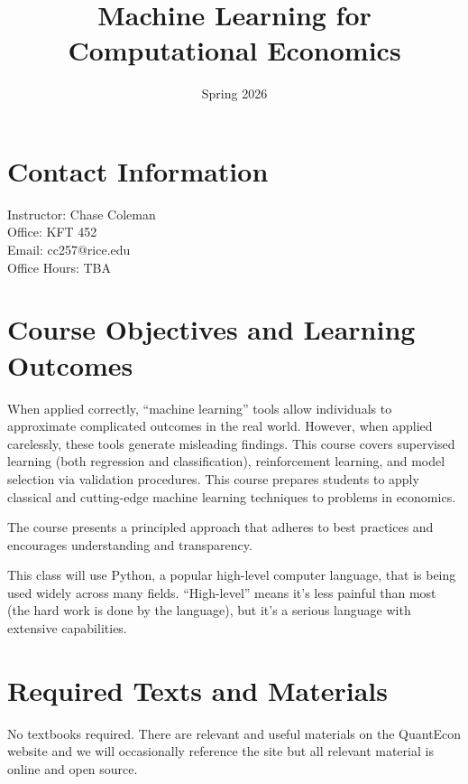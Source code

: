 \documentclass[11pt]{article}
\title{Machine Learning for Computational Economics}
\date{Spring 2026}
\begin{document}
    \maketitle

    \begin{flushleft}
        \section{Contact Information}
        \label{contact-information}

        Instructor: Chase Coleman\\ Office: KFT 452\\ Email: cc257@rice.edu\\
        Office Hours: TBA

        \section{Course Objectives and Learning Outcomes}
        \label{course-objectives-and-learning-outcomes}

        When applied correctly, ``machine learning'' tools allow individuals to
        approximate complicated outcomes in the real world. However, when
        applied carelessly, these tools generate misleading findings. This
        course covers supervised learning (both regression and classification), reinforcement
        learning, and model selection via validation procedures. This course prepares
        students to apply classical and cutting-edge machine learning techniques to
        problems in economics.

        The course presents a principled approach that adheres to best practices and
        encourages understanding and transparency.

        This class will use Python, a popular high-level computer language, that is
        being used widely across many fields. ``High-level'' means it’s less
        painful than most (the hard work is done by the language), but it’s a serious
        language with extensive capabilities.

        \section{Required Texts and Materials}
        \label{required-texts-and-materials}

        No textbooks required. There are relevant and useful materials on the QuantEcon
        website and we will occasionally reference the site but all relevant material
        is online and open source.


\end{flushleft}
\end{document}
